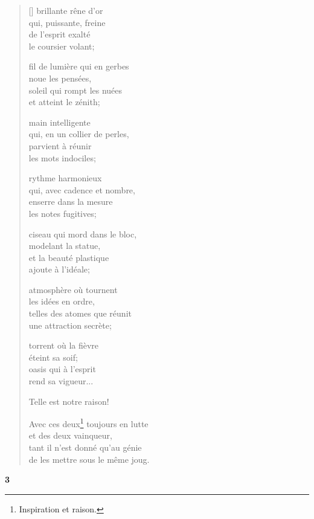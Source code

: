 \documentclass[a4paper,12pt]{book}
\begin{document}
\begin{verse}[\versewidth]
  brillante rêne d'or \\
  qui, puissante, freine \\
  de l'esprit exalté \\
  le coursier volant;

  fil de lumière qui en gerbes \\
  noue les pensées, \\
  soleil qui rompt les nuées \\
  et atteint le zénith;

  main intelligente \\
  qui, en un collier de perles, \\
  parvient à réunir \\
  les mots indociles;

  rythme harmonieux \\
  qui, avec cadence et nombre, \\
  enserre dans la mesure \\
  les notes fugitives;

  ciseau qui mord dans le bloc, \\
  modelant la statue, \\
  et la beauté plastique \\
  ajoute à l'idéale;

  atmosphère où tournent \\
  les idées en ordre, \\
  telles des atomes que réunit \\
  une attraction secrète;

  torrent où la fièvre \\
  éteint sa soif; \\
  oasis qui à l'esprit \\
  rend sa vigueur...

  Telle est notre raison!

  Avec ces deux\footnote{Inspiration et raison.} toujours en lutte \\
  et des deux vainqueur, \\
  tant il n'est donné qu'au génie \\
  de les mettre sous le même joug.
\end{verse}

\bigskip

\begin{center}
  \textbf{3}
\end{center}
\end{document}
